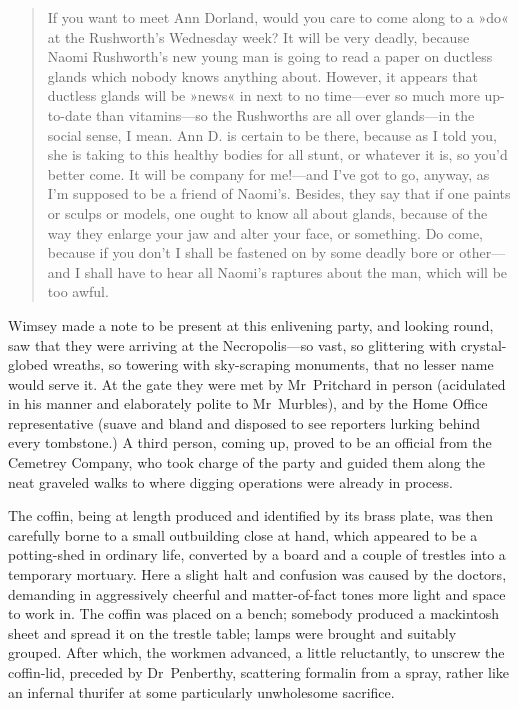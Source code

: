 \begin{quote}If you want to meet Ann Dorland, would you care to come along to a »do« at the Rushworth's Wednesday week? It will be very deadly, because Naomi Rushworth's new young man is going to read a paper on ductless glands which nobody knows anything about. However, it appears that ductless glands will be »news« in next to no time—ever so much more up-to-date than vitamins—so the Rushworths are all over glands—in the social sense, I mean. Ann D. is certain to be there, because as I told you, she is taking to this healthy bodies for all stunt, or whatever it is, so you'd better come. It will be company for me!—and I've got to go, anyway, as I'm supposed to be a friend of Naomi's. Besides, they say that if one paints or sculps or models, one ought to know all about glands, because of the way they enlarge your jaw and alter your face, or something. Do come, because if you don't I shall be fastened on by some deadly bore or other—and I shall have to hear all Naomi's raptures about the man, which will be too awful.
\end{quote}

Wimsey made a note to be present at this enlivening party, and looking round, saw that they were arriving at the Necropolis—so vast, so glittering with crystal-globed wreaths, so towering with sky-scraping monuments, that no lesser name would serve it. At the gate they were met by Mr~Pritchard in person (acidulated in his manner and elaborately polite to Mr~Murbles), and by the Home Office representative (suave and bland and disposed to see reporters lurking behind every tombstone.) A third person, coming up, proved to be an official from the Cemetrey Company, who took charge of the party and guided them along the neat graveled walks to where digging operations were already in process.

The coffin, being at length produced and identified by its brass plate, was then carefully borne to a small outbuilding close at hand, which appeared to be a potting-shed in ordinary life, converted by a board and a couple of trestles into a temporary mortuary. Here a slight halt and confusion was caused by the doctors, demanding in aggressively cheerful and matter-of-fact tones more light and space to work in. The coffin was placed on a bench; somebody produced a mackintosh sheet and spread it on the trestle table; lamps were brought and suitably grouped. After which, the workmen advanced, a little reluctantly, to unscrew the coffin-lid, preceded by Dr~Penberthy, scattering formalin from a spray, rather like an infernal thurifer at some particularly unwholesome sacrifice.

